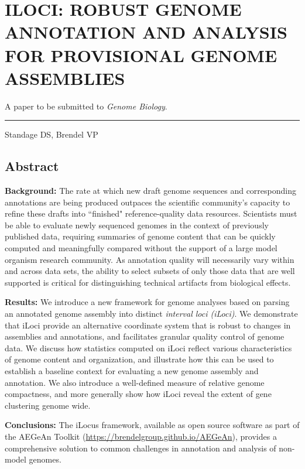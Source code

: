\chapter{ILOCI: ROBUST GENOME ANNOTATION AND ANALYSIS FOR PROVISIONAL GENOME ASSEMBLIES}

A paper to be submitted to \textit{Genome Biology}.

\noindent\hfil\rule{0.5\textwidth}{.4pt}\hfil

Standage DS, Brendel VP

\section{Abstract}

\noindent \textbf{Background:}
The rate at which new draft genome sequences and corresponding annotations are being produced outpaces the scientific community's capacity to refine these drafts into ``finished" reference-quality data resources.
Scientists must be able to evaluate newly sequenced genomes in the context of previously published data, requiring summaries of genome content that can be quickly computed and meaningfully compared without the support of a large model organism research community.
As annotation quality will necessarily vary within and across data sets, the ability to select subsets of only those data that are well supported is critical for distinguishing technical artifacts from biological effects.

\noindent \textbf{Results:}
We introduce a new framework for genome analyses based on parsing an annotated genome assembly into distinct \textit{interval loci (iLoci)}.
We demonstrate that iLoci provide an alternative coordinate system that is robust to changes in assemblies and annotations, and facilitates granular quality control of genome data.
We discuss how statistics computed on iLoci reflect various characteristics of genome content and organization, and illustrate how this can be used to establish a baseline context for evaluating a new genome assembly and annotation.
We also introduce a well-defined measure of relative genome compactness, and more generally show how iLoci reveal the extent of gene clustering genome wide.

\noindent \textbf{Conclusions:}
The iLocus framework, available as open source software as part of the AEGeAn Toolkit (\url{https://brendelgroup.github.io/AEGeAn}), provides a comprehensive solution to common challenges in annotation and analysis of non-model genomes.

